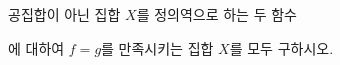 공집합이 아닌 집합 $X$를 정의역으로 하는 두 함수\par\smallskip{}\par\smallskip\noindent 에 대하여 $f=g$를 만족시키는 집합 $X$를 모두 구하시오.
